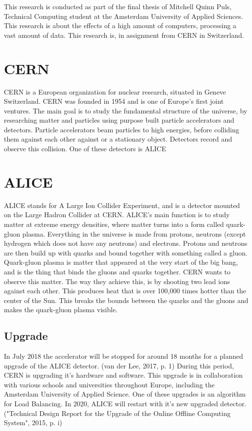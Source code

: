 This research is conducted as part of the final thesis of Mitchell Quinn Puls, Technical Computing student at the Amsterdam University of Applied Sciences. This research is about the effects of a high amount of computers, processing a vast amount of data. This research is, in assignment from CERN in Switzerland. 
\section{CERN}
CERN is a European organization for  nuclear research, situated in Geneve Switzerland. CERN was founded in 1954 and is one of Europe's first joint ventures. The main goal is to study the fundamental structure of the universe, by researching matter and particles using purpose built particle accelerators and detectors. Particle accelerators beam particles to high energies, before colliding them against each other against or a stationary object. Detectors record and observe this collision. One of these detectors is ALICE
\section{ALICE}
ALICE stands for A Large Ion Collider Experiment, and is a detector mounted on the Large Hadron Collider at CERN.  ALICE's main function is to study matter at extreme energy densities, where matter turns into a form called quark-gluon plasma. Everything in the universe is made from protons, neutrons (except hydrogen which does not have any neutrons) and electrons. Protons and neutrons are then build up with quarks and bound together with something called a gluon. Quark-gluon plasma is matter that appeared at the very start of the big bang, and is the thing that binds the gluons and quarks together. CERN wants to observe this matter. The way they achieve this, is by shooting two lead ions against each other. This produces heat that is over 100,000 times hotter than the center of the Sun. This breaks the bounds between the quarks and the gluons and makes the quark-gluon plasma visible.
\subsection{Upgrade}
In July 2018 the accelerator will be stopped for around 18 months for a planned upgrade of the ALICE detector. (van der Lee, 2017, p. 1) During this period, CERN is upgrading it's hardware and software. This upgrade is in collaboration with various schools and universities throughout Europe, including the Amsterdam University of Applied Science. One of these upgrades is an algorithm for Load Balancing. In 2020, ALICE will restart with it's new upgraded detector. ("Technical Design Report for the Upgrade of the Online Offline Computing System", 2015, p. i)

